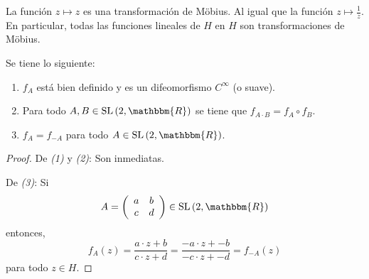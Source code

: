 \documentclass[12pt]{report}
\theoremstyle{largebreak}
\newcommand{\bbm}[1]{\ensuremath{\mathbbm{#1}}}
\newcommand{\SL}[1]{\ensuremath{\textup{SL}\left(#1\right)}}
\begin{document}
    \begin{exa}
        La función $z\mapsto z$ es una transformación de Möbius. Al igual que la función $z\mapsto\frac{1}{z}$. En particular, todas las funciones lineales de $H$ en $H$ son transformaciones de Möbius.
    \end{exa}

    \begin{propo}
        Se tiene lo siguiente:
        \begin{enumerate}[label = \textit{(\arabic*)}]
            \item $f_A$ está bien definido y es un difeomorfismo $C^\infty$ (o suave).
            \item Para todo $A,B\in\SL{2,\bbm{R}}$ se tiene que $f_{A\cdot B}=f_A\circ f_B$.
            \item $f_A=f_{-A}$ para todo $A\in\SL{2,\bbm{R}}$.
        \end{enumerate}
    \end{propo}

    \begin{proof}
        De \textit{(1)} y \textit{(2)}: Son inmediatas.

        De \textit{(3)}: Si
        \begin{equation*}
            A=\left(
                \begin{array}{cc}
                    a & b \\
                    c & d \\
                \end{array}
             \right)\in\SL{2,\bbm{R}}
        \end{equation*}
        entonces,
        \begin{equation*}
            f_A(z)=\frac{a\cdot z+b}{c\cdot z+d}=\frac{-a\cdot z+-b}{-c\cdot z+-d}=f_{-A}(z)
        \end{equation*}
        para todo $z\in H$.
    \end{proof}
\end{document}
